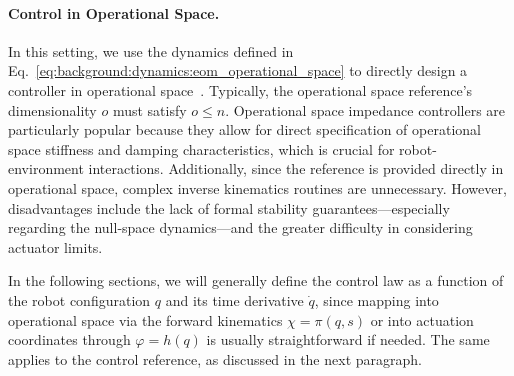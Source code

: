 \paragraph{Control in Operational Space.}
In this setting, we use the dynamics defined in Eq.~\ref{eq:background:dynamics:eom_operational_space} to directly design a controller in operational space~\citep{khatib1987unified}. Typically, the operational space reference’s dimensionality $o$ must satisfy $o \leq n$. Operational space impedance controllers are particularly popular because they allow for direct specification of operational space stiffness and damping characteristics, which is crucial for robot-environment interactions. Additionally, since the reference is provided directly in operational space, complex inverse kinematics routines are unnecessary. However, disadvantages include the lack of formal stability guarantees—especially regarding the null-space dynamics—and the greater difficulty in considering actuator limits.

In the following sections, we will generally define the control law as a function of the robot configuration $q$ and its time derivative $\dot{q}$, since mapping into operational space via the forward kinematics $\chi = \pi(q,s)$ or into actuation coordinates through $\varphi = h(q)$ is usually straightforward if needed. The same applies to the control reference, as discussed in the next paragraph.

